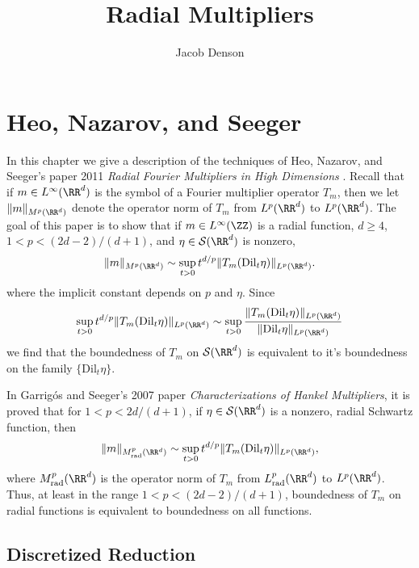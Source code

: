 

\title{Radial Multipliers}
\author{Jacob Denson}



\maketitle

\tableofcontents

\newpage

\chapter{Heo, Nazarov, and Seeger}

In this chapter we give a description of the techniques of Heo, Nazarov, and Seeger's paper 2011 \emph{Radial Fourier Multipliers in High Dimensions} \cite{HeoNazrovSeeger2011}. Recall that if $m \in L^\infty(\RR^d)$ is the symbol of a Fourier multiplier operator $T_m$, then we let $\| m \|_{M^p(\RR^d)}$ denote the operator norm of $T_m$ from $L^p(\RR^d)$ to $L^p(\RR^d)$. The goal of this paper is to show that if $m \in L^\infty(\ZZ)$ is a radial function, $d \geq 4$, $1 < p < (2d - 2)/(d+1)$, and $\eta \in \mathcal{S}(\RR^d)$ is nonzero,
%
\[ \| m \|_{M^p(\RR^d)} \sim \sup_{t > 0} t^{d/p} \| T_m(\text{Dil}_t \eta) \|_{L^p(\RR^d)}. \]
%
where the implicit constant depends on $p$ and $\eta$. Since
%
\[ \sup_{t > 0} t^{d/p} \| T_m(\text{Dil}_t \eta) \|_{L^p(\RR^d)} \sim \sup_{t > 0} \frac{\| T_m(\text{Dil}_t \eta) \|_{L^p(\RR^d)}}{\| \text{Dil}_t \eta \|_{L^p(\RR^d)}} \]
%
we find that the boundedness of $T_m$ on $\mathcal{S}(\RR^d)$ is equivalent to it's boundedness on the family $\{ \text{Dil}_t \eta \}$.

In Garrig\'{o}s and Seeger's 2007 paper \emph{Characterizations of Hankel Multipliers}, it is proved that for $1 < p < 2d/(d+1)$, if $\eta \in \mathcal{S}(\RR^d)$ is a nonzero, radial Schwartz function, then
%
\[ \| m \|_{M^p_{\text{rad}}(\RR^d)} \sim \sup_{t > 0} t^{d/p}  \| T_m(\text{Dil}_t \eta) \|_{L^p(\RR^d)}, \]
%
where $M^p_{\text{rad}}(\RR^d)$ is the operator norm of $T_m$ from $L^p_{\text{rad}}(\RR^d)$ to $L^p(\RR^d)$. Thus, at least in the range $1 < p < (2d - 2)/(d+1)$, boundedness of $T_m$ on radial functions is equivalent to boundedness on all functions.

\section{Discretized Reduction}


